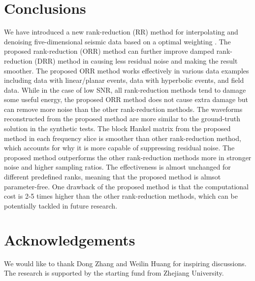 \section{Conclusions}
We have introduced a new rank-reduction (RR) method for interpolating and denoising five-dimensional seismic data based on a optimal weighting . The proposed  rank-reduction (ORR) method can further improve  damped rank-reduction (DRR) method in causing less residual noise and making the result smoother. The proposed ORR method works effectively in various data examples including data with linear/planar events, data with hyperbolic events, and field data. While in the case of low SNR, all rank-reduction methods tend to damage some useful energy, the proposed ORR method does not cause extra damage but can remove more noise than the other rank-reduction methods. The waveforms reconstructed from the proposed method are more similar to the ground-truth solution in the synthetic tests. The block Hankel matrix from the proposed method in each frequency slice is smoother than other rank-reduction method, which accounts for why it is more capable of suppressing residual noise. The proposed method outperforms the other rank-reduction methods more in stronger noise and higher sampling ratios. The effectiveness is almost unchanged for different predefined ranks, meaning that the proposed method is almsot parameter-free. One drawback of the proposed method is that the computational cost is 2-5 times higher than the other rank-reduction methods, which can be potentially tackled in future research.


\section{Acknowledgements}
We would like to thank Dong Zhang and Weilin Huang for inspiring discussions.  The research is supported by the starting fund from Zhejiang University.


